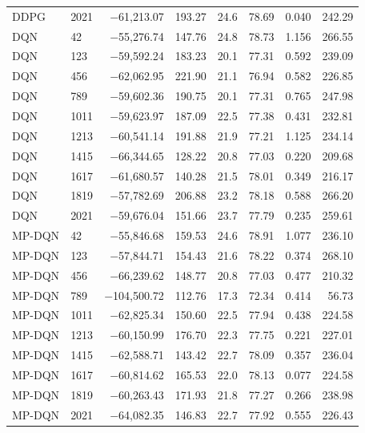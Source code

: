 \begin{table}[htbp]
{\begin{tabular}{llrrrrrr}
DDPG & 2021 & $-$61,213.07 & 193.27 & 24.6 & 78.69 & 0.040 & 242.29 \\
\addlinespace
DQN & 42 & $-$55,276.74 & 147.76 & 24.8 & 78.73 & 1.156 & 266.55 \\
DQN & 123 & $-$59,592.24 & 183.23 & 20.1 & 77.31 & 0.592 & 239.09 \\
DQN & 456 & $-$62,062.95 & 221.90 & 21.1 & 76.94 & 0.582 & 226.85 \\
DQN & 789 & $-$59,602.36 & 190.75 & 20.1 & 77.31 & 0.765 & 247.98 \\
DQN & 1011 & $-$59,623.97 & 187.09 & 22.5 & 77.38 & 0.431 & 232.81 \\
DQN & 1213 & $-$60,541.14 & 191.88 & 21.9 & 77.21 & 1.125 & 234.14 \\
DQN & 1415 & $-$66,344.65 & 128.22 & 20.8 & 77.03 & 0.220 & 209.68 \\
DQN & 1617 & $-$61,680.57 & 140.28 & 21.5 & 78.01 & 0.349 & 216.17 \\
DQN & 1819 & $-$57,782.69 & 206.88 & 23.2 & 78.18 & 0.588 & 266.20 \\
DQN & 2021 & $-$59,676.04 & 151.66 & 23.7 & 77.79 & 0.235 & 259.61 \\
\addlinespace
MP-DQN & 42 & $-$55,846.68 & 159.53 & 24.6 & 78.91 & 1.077 & 236.10 \\
MP-DQN & 123 & $-$57,844.71 & 154.43 & 21.6 & 78.22 & 0.374 & 268.10 \\
MP-DQN & 456 & $-$66,239.62 & 148.77 & 20.8 & 77.03 & 0.477 & 210.32 \\
MP-DQN & 789 & $-$104,500.72 & 112.76 & 17.3 & 72.34 & 0.414 & 56.73 \\
MP-DQN & 1011 & $-$62,825.34 & 150.60 & 22.5 & 77.94 & 0.438 & 224.58 \\
MP-DQN & 1213 & $-$60,150.99 & 176.70 & 22.3 & 77.75 & 0.221 & 227.01 \\
MP-DQN & 1415 & $-$62,588.71 & 143.42 & 22.7 & 78.09 & 0.357 & 236.04 \\
MP-DQN & 1617 & $-$60,814.62 & 165.53 & 22.0 & 78.13 & 0.077 & 224.58 \\
MP-DQN & 1819 & $-$60,263.43 & 171.93 & 21.8 & 77.27 & 0.266 & 238.98 \\
MP-DQN & 2021 & $-$64,082.35 & 146.83 & 22.7 & 77.92 & 0.555 & 226.43 \\
\bottomrule
\end{tabular}%
}
\end{table}

